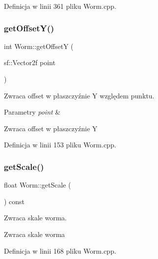 Definicja w linii 361 pliku Worm.\+cpp.

\mbox{\label{class_worm_a5a9fb6f1859a7b5cf6c447ea3ae0c1e5}} 
\subsubsection{\texorpdfstring{get\+Offset\+Y()}{getOffsetY()}}
{\footnotesize\ttfamily int Worm\+::get\+OffsetY (\begin{DoxyParamCaption}\item[{sf\+::\+Vector2f}]{point }\end{DoxyParamCaption})}



Zwraca offset w płaszczyźnie Y względem punktu. 


\begin{DoxyParams}{Parametry}
{\em point} & \\
\hline
\end{DoxyParams}
\begin{DoxyReturn}{Zwraca}
offset w płaszczyźnie Y 
\end{DoxyReturn}


Definicja w linii 153 pliku Worm.\+cpp.

\mbox{\label{class_worm_a72cf5070503bcba6423773de3367cdfd}} 
\subsubsection{\texorpdfstring{get\+Scale()}{getScale()}}
{\footnotesize\ttfamily float Worm\+::get\+Scale (\begin{DoxyParamCaption}{ }\end{DoxyParamCaption}) const}



Zwraca skale worma. 

\begin{DoxyReturn}{Zwraca}
skale worma 
\end{DoxyReturn}


Definicja w linii 168 pliku Worm.\+cpp.

\mbox{\label{class_worm_a9b314b9a4bb91830aac7f616ef071c07}} 
